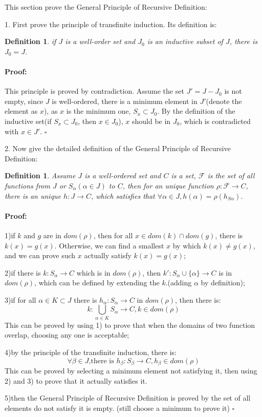 \documentclass{article}
\newtheorem{definition}[theorem]{Definition}
\newenvironment{myproof}{\ignorespaces\paragraph{Proof:}}{\hfill $\square$\par\noindent}
\begin{document}
    This section prove the General Principle of Recursive Definition:

    1. First prove the principle of transfinite induction. Its definition is: 
\begin{definition}
    if $J$ is a well-order set and $J_0$ is an inductive subset of $J$, there is $J_0=J$.
\end{definition}
\begin{myproof}
    This principle is proved by contradiction. Assume the set $J'=J-J_0$ is not empty, since $J$ is well-ordered, 
    there is a minimum element in $J'$(denote the element as $x$), as $x$ is the minimum one, $S_x\subset J_0$. 
    By the definition of the inductive set(if $S_x\subset J_0$, then $x\in J_0$), $x$ should be in $J_0$, 
    which is contradicted with $x\in J'$.
\end{myproof}

    2. Now give the detailed definition of the General Principle of Recursive Definition:
\begin{definition}
    Assume $J$ is a well-ordered set and $C$ is a set, 
    $\mathscr F$ is the set of all functions from $J$ or $S_\alpha(\alpha\in J)$ to $C$, 
    then for an unique function $\rho:\mathscr F\rightarrow C$, there is an unique $h:J\rightarrow C$, 
    which satisfies that $\forall \alpha\in J, h(\alpha)=\rho(h_{S\alpha})$. 
\end{definition}

\begin{myproof}
    1)if $k$ and $g$ are in $dom(\rho)$, then for all $x\in dom(k)\cap dom(g)$, there is $k(x)=g(x)$. 
    Otherwise, we can find a smallest $x$ by which $k(x)\neq g(x)$, and we can prove such $x$ actually satisfy $k(x)=g(x)$;

    2)if there is $k:S_\alpha\rightarrow C$ which is in $dom(\rho)$, then $k':S_\alpha\cup\{\alpha\}\rightarrow C$ is in $dom(\rho)$, 
    which can be defined by extending the $k$.(adding $\alpha$ by definition);

    3)if for all $\alpha\in K\subset J$ there is $h_\alpha:S_\alpha\rightarrow C$ in $dom(\rho)$, then there is: 
    $$k:\bigcup_{\alpha\in K}S_\alpha\rightarrow C, k\in dom(\rho)$$
    This can be proved by using 1) to prove that when the domains of two function overlap, choosing any one is acceptable; 

    4)by the principle of the transfinite induction, there is:
    $$\forall\beta\in J\text{,there is }h_\beta:S_\beta\rightarrow C, h_\beta\in dom(\rho)$$
    This can be proved by selecting a minimum element not satisfying it, then using 2) and 3) to prove that it actually satisfies it. 

    5)then the General Principle of Recursive Definition is proved by the set of all elements do not satisfy it is empty. (still choose a minimum to prove it)
\end{myproof}
\end{document}
